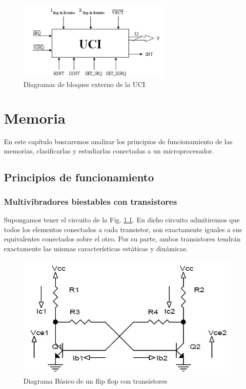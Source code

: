 \documentclass[12pt]{book}
\theoremstyle{definition}
\theoremstyle{remark}
\theoremstyle{plain}
\begin{document}
\begin{figure}
\centering
\includegraphics[width=3in]{UCI.jpg}
\caption{Diagramas de bloques externo de la UCI}
\label{fig38}
\end{figure}






\chapter{Memoria}
En este capítulo buscaremos analizar los principios de funcionamiento de las memorias, clasificarlas y estudiarlas conectadas a un microprocesador.

\section{Principios de funcionamiento}

\subsection{Multivibradores biestables con transistores}

Supongamos tener el circuito de la Fig. \ref{fig5}. En dicho circuito admitiremos que todos los elementos conectados a cada transistor, son exactamente iguales a sus equivalentes conectados sobre el otro. Por su parte, ambos transistores tendrán exactamente las mismas características estáticas y dinámicas.

\begin{figure}
\centering
\includegraphics[width=5in]{Biestable.jpg}
\caption{Diagrama Básico de un flip flop con transistores}
\label{fig5}
\end{figure}
\end{document}
